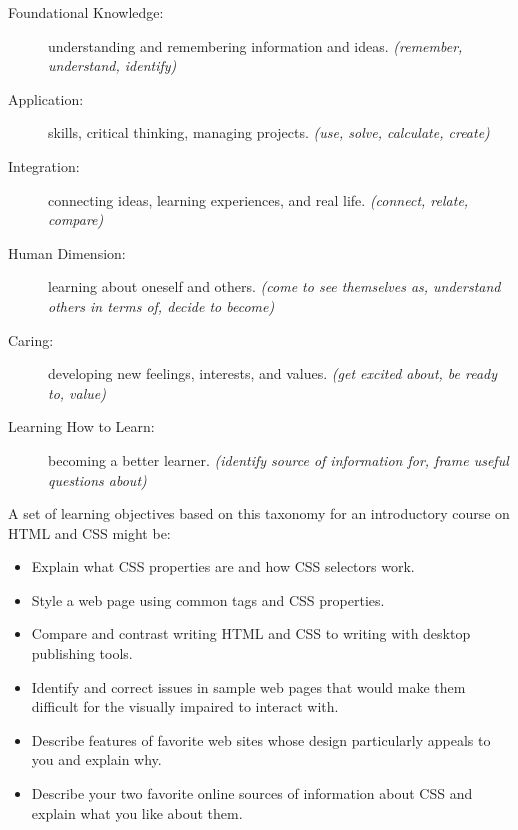\begin{description}

\item[Foundational Knowledge:]
  understanding and remembering information and ideas.
  \emph{(remember, understand, identify)}

\item[Application:]
  skills, critical thinking, managing projects.
  \emph{(use, solve, calculate, create)}

\item[Integration:]
  connecting ideas, learning experiences, and real life.
  \emph{(connect, relate, compare)}

\item[Human Dimension:]
  learning about oneself and others.
  \emph{(come to see themselves as, understand others in terms of, decide to become)}

\item[Caring:]
  developing new feelings, interests, and values.
  \emph{(get excited about, be ready to, value)}

\item[Learning How to Learn:]
  becoming a better learner.
  \emph{(identify source of information for, frame useful questions about)}

\end{description}

A set of learning objectives based on this taxonomy
for an introductory course on HTML and CSS might be:

\begin{itemize}

\item
  Explain what CSS properties are and how CSS selectors work.

\item
  Style a web page using common tags and CSS properties.

\item
  Compare and contrast writing HTML and CSS
  to writing with desktop publishing tools.

\item
  Identify and correct issues in sample web pages
  that would make them difficult for the visually impaired to interact with.

\item
  Describe features of favorite web sites
  whose design particularly appeals to you
  and explain why.

\item
  Describe your two favorite online sources of information about CSS
  and explain what you like about them.

\end{itemize}

